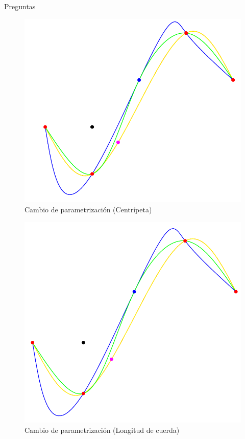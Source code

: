 \begin{section}{Preguntas}
\begin{itemize}
	\begin{figure}[H]
		  \centering
			\includegraphics[width=14cm]{graficos/paramVSreparamCentripetal.pdf}
		  \caption{Cambio de parametrización (Centrípeta)}
		  \label{fig:paramChangeCentripetal}
	\end{figure}

	\begin{figure}[H]
		  \centering
			\includegraphics[width=14cm]{graficos/paramVSreparamChord.pdf}
		  \caption{Cambio de parametrización (Longitud de cuerda)}
		  \label{fig:paramChangeCHLength}
	\end{figure}
	\VSP

\end{itemize}	



\end{section}
